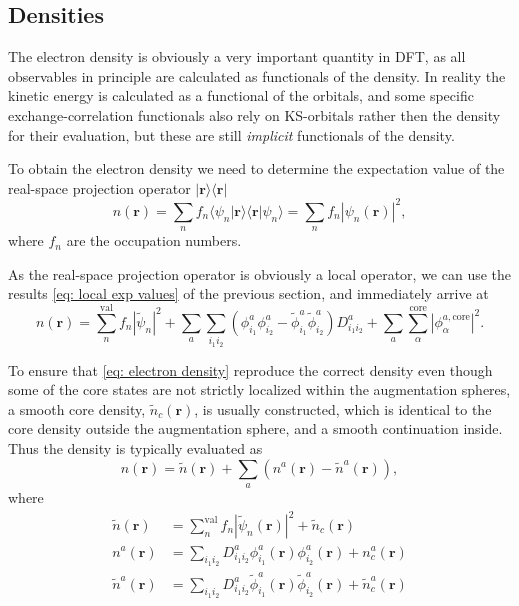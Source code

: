 \documentclass[a4paper]{article}
\newcommand{\f}[1]{\mathbf{#1}}
\newcommand{\s}[1]{\tilde{#1}}
\newcommand{\bra}[1]{\langle #1 |}
\newcommand{\ket}[1]{| #1 \rangle}
\newcommand{\braket}[2]{\langle #1 | #2 \rangle}
\begin{document}
\subsection{Densities}\label{sec: densities}
The electron density is obviously a very important quantity in
DFT, as all observables in principle are calculated as functionals
of the density. In reality the kinetic energy is calculated as a
functional of the orbitals, and some specific exchange-correlation
functionals also rely on KS-orbitals rather then the density for
their evaluation, but these are still \emph{implicit}
functionals of the density.
\par To obtain the electron density we need to determine the
expectation value of the real-space projection operator
$\ket{\f{r}}\bra{\f{r}}$
%
\begin{equation}
n(\f{r}) = \sum_n f_n \braket{\psi_n}{\f{r}}\braket{\f{r}}{\psi_n} = \sum_n
f_n|\psi_n(\f{r})|^2,
\end{equation}
%
where $f_n$ are the occupation numbers.
\par As the real-space projection operator is obviously a local
operator, we can use the results \ref{eq: local exp values} of the
previous section, and immediately arrive at
%
\begin{equation}\label{eq: electron density}
n(\f{r}) = \sum_n^\text{val} f_n |\s{\psi}_n|^2 + \sum_a
\sum_{i_1i_2} \left(\phi_{i_1}^{a} \phi_{i_2}^{a} -
\s{\phi}_{i_1}^{a} \s{\phi}_{i_2}^{a} \right) D_{i_1i_2}^a + \sum_a
\sum_\alpha^\text{core} |\phi_\alpha^{a,\text{core}}|^2.
\end{equation}
%
\par To ensure that \ref{eq: electron density} reproduce the
correct density even though some of the core states are not
strictly localized within the augmentation spheres, a smooth core
density, $\s{n}_c(\f{r})$, is usually constructed, which is
identical to the core density outside the augmentation sphere, and
a smooth continuation inside. Thus the density is typically
evaluated as
%
\begin{equation}\label{eq: PAW density}
n(\f{r}) = \s{n}(\f{r}) + \sum_a \left( n^a(\f{r}) -
\s{n}^a(\f{r}) \right),
\end{equation}
%
where
%
\begin{subequations}\label{eq: density contributions}
\begin{align}
\s{n}(\f{r})   &= \sum_n^\text{val} f_n |\s{\psi}_n(\f{r})|^2 + \s{n}_c(\f{r})\label{eq: smooth n}\\
n^a(\f{r})     &= \sum_{i_1i_2} D_{i_1i_2}^a \phi_{i_1}^a(\f{r})\phi_{i_2}^{a}(\f{r}) + n_c^a(\f{r})\label{eq: partial n}\\
\s{n}^a(\f{r}) &= \sum_{i_1i_2} D_{i_1i_2}^a \s{\phi}_{i_1}^a(\f{r})\s{\phi}_{i_2}^{a}(\f{r}) + \s{n}_c^a(\f{r})\label{eq: smooth partial n}
\end{align}
\end{subequations}
%
\end{document}
